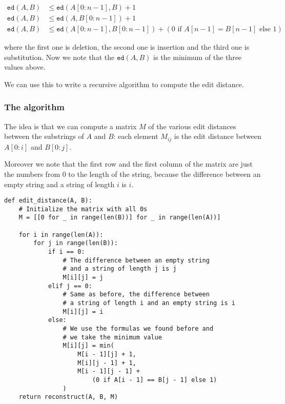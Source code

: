 \documentclass[14pt]{extarticle}
\begin{document}
\begin{align}
    \texttt{ed}(A, B) & \leq \texttt{ed}(A[0:n-1], B) + 1                                                      \\
    \texttt{ed}(A, B) & \leq \texttt{ed}(A, B[0:n-1]) + 1                                                      \\
    \texttt{ed}(A, B) & \leq \texttt{ed}(A[0:n-1], B[0:n-1]) + (0 \text{ if } A[n-1] = B[n-1] \text{ else } 1)
\end{align}

where the first one is deletion, the second one is insertion and the third one is substitution.
Now we note that the $\texttt{ed}(A, B)$ is the minimum of the three values above.

We can use this to write a recursive algorithm to compute the edit distance.

\subsubsection{The algorithm}

The idea is that we can compute a matrix $M$ of the various edit distances between the substrings of $A$ and $B$: each element $M_{ij}$ is the edit distance between $A[0:i]$ and $B[0:j]$.

Moreover we note that the first row and the first column of the matrix are just the numbers from 0 to the length of the string, because the difference between an empty string and a string of length $i$ is $i$.

\begin{verbatim}
def edit_distance(A, B):
    # Initialize the matrix with all 0s
    M = [[0 for _ in range(len(B))] for _ in range(len(A))]

    for i in range(len(A)):
        for j in range(len(B)):
            if i == 0:
                # The difference between an empty string
                # and a string of length j is j
                M[i][j] = j
            elif j == 0:
                # Same as before, the difference between
                # a string of length i and an empty string is i
                M[i][j] = i
            else:
                # We use the formulas we found before and
                # we take the minimum value
                M[i][j] = min(
                    M[i - 1][j] + 1,
                    M[i][j - 1] + 1,
                    M[i - 1][j - 1] +
                        (0 if A[i - 1] == B[j - 1] else 1)
                )
    return reconstruct(A, B, M)
\end{verbatim}
\end{document}
